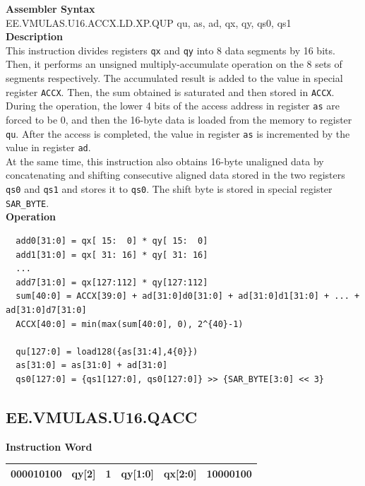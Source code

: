 \textbf{Assembler Syntax} \\
EE.VMULAS.U16.ACCX.LD.XP.QUP qu, as, ad, qx, qy, qs0, qs1 \\
\textbf{Description} \\
This instruction divides registers \lstinline{qx} and \lstinline{qy} into 8 data segments by 16 bits. Then, it performs an unsigned multiply-accumulate operation on the 8 sets of segments respectively. The accumulated result is added to the value in special register \lstinline{ACCX}. Then, the sum obtained is saturated and then stored in \lstinline{ACCX}.\\
During the operation, the lower 4 bits of the access address in register \lstinline{as} are forced to be 0, and then the 16-byte data is loaded from the memory to register \lstinline{qu}. After the access is completed, the value in register \lstinline{as} is incremented by the value in register \lstinline{ad}.\\
At the same time, this instruction also obtains 16-byte unaligned data by concatenating and shifting consecutive aligned data stored in the two registers \lstinline{qs0} and \lstinline{qs1} and stores it to \lstinline{qs0}. The shift byte is stored in special register \lstinline{SAR_BYTE}.\\
\textbf{Operation}
\begin{lstlisting}
  add0[31:0] = qx[ 15:  0] * qy[ 15:  0]
  add1[31:0] = qx[ 31: 16] * qy[ 31: 16]
  ...
  add7[31:0] = qx[127:112] * qy[127:112]
  sum[40:0] = ACCX[39:0] + ad[31:0]d0[31:0] + ad[31:0]d1[31:0] + ... + ad[31:0]d7[31:0]
  ACCX[40:0] = min(max(sum[40:0], 0), 2^{40}-1)

  qu[127:0] = load128({as[31:4],4{0}})
  as[31:0] = as[31:0] + ad[31:0]
  qs0[127:0] = {qs1[127:0], qs0[127:0]} >> {SAR_BYTE[3:0] << 3}
\end{lstlisting}

\clearpage
\subsection{EE.VMULAS.U16.QACC}\label{instruction:EEVMULASU16QACC}
\setlength\tabcolsep{6pt}
\textbf{Instruction Word} \\
\begin{tabular}{|c|c|c|c|c|c|}
	\hline
	000010100 & qy[2] & 1 & qy[1:0] & qx[2:0] & 10000100 \\
	\hline
\end{tabular}

